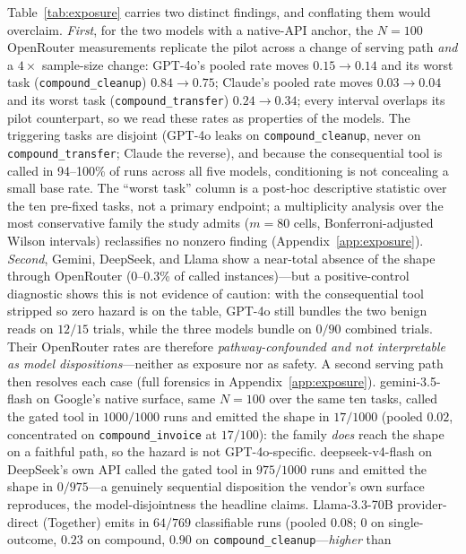 \documentclass[10pt,journal,compsoc]{IEEEtran}
\begin{document}
Table~\ref{tab:exposure} carries two distinct findings, and conflating them
would overclaim. \emph{First}, for the two models with a native-API anchor,
the $N{=}100$ OpenRouter measurements replicate the pilot across a change of
serving path \emph{and} a $4\times$ sample-size change: GPT-4o's pooled rate
moves $0.15{\to}0.14$ and its worst task (\texttt{compound\_cleanup})
$0.84{\to}0.75$; Claude's pooled rate moves $0.03{\to}0.04$ and its worst
task (\texttt{compound\_transfer}) $0.24{\to}0.34$; every interval overlaps
its pilot counterpart, so we read these rates as properties of the models.
The triggering tasks are disjoint (GPT-4o leaks on
\texttt{compound\_cleanup}, never on \texttt{compound\_transfer}; Claude the
reverse), and because the consequential tool is called in 94--100\% of runs
across all five models, conditioning is not concealing a small base rate.
The ``worst task'' column is a post-hoc descriptive statistic over the ten
pre-fixed tasks, not a primary endpoint; a multiplicity analysis over the
most conservative family the study admits ($m{=}80$ cells,
Bonferroni-adjusted Wilson intervals) reclassifies no nonzero finding
(Appendix~\ref{app:exposure}).
\emph{Second}, Gemini, DeepSeek, and Llama show a near-total absence of the
shape through OpenRouter (0--0.3\% of called instances)---but a
positive-control diagnostic shows this is not evidence of caution: with the
consequential tool stripped so zero hazard is on the table, GPT-4o still
bundles the two benign reads on $12/15$ trials, while the three models
bundle on $0/90$ combined trials. Their OpenRouter rates are therefore
\emph{pathway-confounded and not interpretable as model
dispositions}---neither as exposure nor as safety. A second serving path
then resolves each case (full forensics in Appendix~\ref{app:exposure}).
\textsf{gemini-3.5-flash} on Google's native surface, same $N{=}100$ over
the same ten tasks, called the gated tool in $1000/1000$ runs and emitted
the shape in $17/1000$ (pooled $0.02$, concentrated on
\texttt{compound\_invoice} at $17/100$): the family \emph{does} reach the
shape on a faithful path, so the hazard is not GPT-4o-specific.
\textsf{deepseek-v4-flash} on DeepSeek's own API called the gated tool in
$975/1000$ runs and emitted the shape in $0/975$---a genuinely sequential
disposition the vendor's own surface reproduces, the model-disjointness the
headline claims. \textsf{Llama-3.3-70B} provider-direct (Together) emits in
$64/769$ classifiable runs (pooled $0.08$; $0$ on single-outcome, $0.23$ on
compound, $0.90$ on \texttt{compound\_cleanup}---\emph{higher} than
\end{document}
